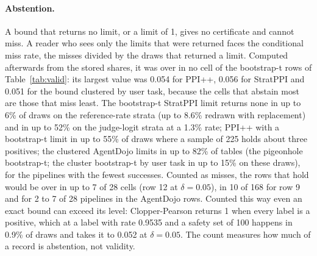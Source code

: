 \begin{table}[p]
\centering
\scriptsize
\setlength{\tabcolsep}{3pt}

\caption{Miss rate against $\delta$, rows 44 to 55. Cells are counted as over / unresolved / at or under $\delta$; the next
column is the largest upper end of a 95\% interval for a cell's miss rate, with the cells still over after a
Bonferroni correction in brackets (for the exact binomial rows, the largest exact miss and the cells above $\delta$). Rows 44 to 46 are the second model family after an update that kept its order of prompts, and 53 to 55 the same
family after a separate update, trained on the guard's flag alone, that reordered them; 47 and 48 exact stratified bounds; 49 to 52 AgentDojo against a fitted crossed model (schemes $P_a$, injection
tasks fixed, and $P_c$, both drawn), where only a bound that fails to compute counts as a miss.}
\label{tab:fullD}
\end{table}

\paragraph{Abstention.} A bound that returns no limit, or a limit of 1, gives no certificate and cannot miss. A reader
who sees only the limits that were returned faces the conditional miss rate, the misses divided by the draws that
returned a limit. Computed afterwards from the stored shares, it was over in no cell of the bootstrap-t rows of
Table~\ref{tab:valid}: its largest value was 0.054 for PPI++, 0.056 for StratPPI and 0.051 for the bound clustered by
user task, because the cells that abstain most are those that miss least. The
bootstrap-t StratPPI limit returns none in up to 6\% of draws on the reference-rate strata (up to 8.6\% redrawn with
replacement) and in up to 52\% on the judge-logit strata at a 1.3\% rate; PPI++ with a bootstrap-t limit in up to 55\% of
draws where a sample of 225 holds about three positives; the clustered AgentDojo limits in up to 82\% of tables (the pigeonhole
bootstrap-t; the cluster bootstrap-t by user task in up to 15\% on these draws), for the pipelines with the fewest
successes. Counted as misses, the rows that hold would be over in up to 7 of 28 cells (row 12
at $\delta=0.05$), in 10 of 168 for row 9 and for 2 to 7 of 28 pipelines in the AgentDojo rows. Counted this way even an
exact bound can exceed its level: Clopper-Pearson returns 1 when every label is a positive, which at a label with rate 0.9535 and a
safety set of 100 happens in 0.9\% of draws and takes it to 0.052 at $\delta=0.05$. The count measures how much of a
record is abstention, not validity.

